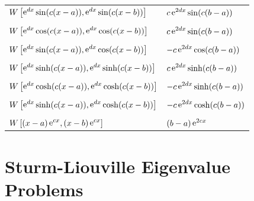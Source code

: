 \begin{longtable}{ll}
  $\displaystyle W \left[ \e^{d x} \sin(c(x-a)), \e^{d x} \sin(c(x-b)) \right]$
  & $\displaystyle c \e^{2 d x} \sin(c (b-a))$ \\
  \\
  $\displaystyle W \left[ \e^{d x} \cos(c(x-a)), \e^{d x} \cos(c(x-b)) \right]$
  & $\displaystyle c \e^{2 d x} \sin(c (b-a))$ \\
  \\
  $\displaystyle W \left[ \e^{d x} \sin(c(x-a)), \e^{d x} \cos(c(x-b)) \right]$
  & $\displaystyle - c \e^{2 d x} \cos(c (b-a))$ \\
  \\
  $\displaystyle W \left[ \e^{d x} \sinh(c(x-a)), \e^{d x} \sinh(c(x-b)) \right]$
  & $\displaystyle c \e^{2 d x} \sinh(c (b-a))$ \\
  \\
  $\displaystyle W \left[ \e^{d x} \cosh(c(x-a)), \e^{d x} \cosh(c(x-b)) \right]$
  & $\displaystyle - c \e^{2 d x} \sinh(c (b-a))$ \\
  \\
  $\displaystyle W \left[ \e^{d x} \sinh(c(x-a)), \e^{d x} \cosh(c(x-b)) \right]$
  & $\displaystyle - c \e^{2 d x} \cosh(c (b-a))$ \\
  \\
  $\displaystyle W \left[ (x-a) \e^{c x}, (x-b) \e^{c x} \right]$
  & $\displaystyle (b-a) \e^{2 c x}$
\end{longtable}















\raggedbottom
\chapter{Sturm-Liouville Eigenvalue Problems}
\raggedbottom 


